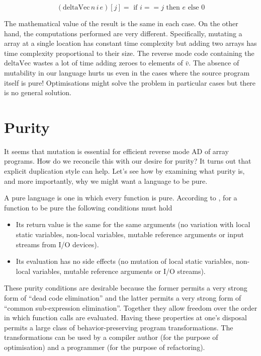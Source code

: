 \documentclass[12pt]{article}
\begin{document}
\[
(\textrm{deltaVec} \, n \, i \, e)[j]
= \textrm{ if } i == j \textrm{ then } e  \textrm{ else } 0
\]

The mathematical value of the result is the same in each case.  On the
other hand, the computations performed are very different.
Specifically, mutating a array at a single location has constant time
complexity but adding two arrays has time complexity proportional to
their size.  The reverse mode code containing the $\textrm{deltaVec}$
wastes a lot of time adding zeroes to elements of $\bar{v}$.  The
absence of mutability in our language hurts us even in the cases where
the source program itself is pure!  Optimisations might solve the
problem in particular cases but there is no general solution.


\section{Purity}

It seems that mutation is essential for efficient reverse mode AD of
array programs.  How do we reconcile this with our desire for purity?
It turns out that explicit duplication style can help.  Let's see how
by examining what purity is, and more importantly, why we might want a
language to be pure.

A pure language is one in which every function is pure.  According to
\cite{purity}, for a function to be pure the following conditions must
hold

\begin{itemize}
  \item
    Its return value is the same for the same arguments (no variation
    with local static variables, non-local variables, mutable
    reference arguments or input streams from I/O devices).

  \item
    Its evaluation has no side effects (no mutation of local
    static variables, non-local variables, mutable reference
    arguments or I/O streams).
\end{itemize}

These purity conditions are desirable because the former permits a
very strong form of ``dead code elimination'' and the latter permits a
very strong form of ``common sub-expression elimination''.  Together
they allow freedom over the order in which function calls are
evaluated.  Having these properties at one's disposal permits a large
class of behavior-preserving program transformations.  The
transformations can be used by a compiler author (for the purpose of
optimisation) and a programmer (for the purpose of refactoring).
\end{document}
